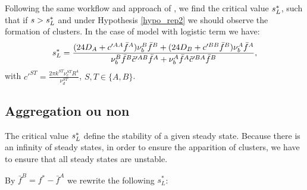 Following the same workflow  and approach of \cite{twoparticule}, we find the critical value ${s^{*}_{L}}$, such that if $s> {s^{*}_{L}}$ and under Hypothesis \ref{hypo_rep2} we should observe the formation of clusters. In the case of model with logistic term we have:
\begin{equation}
{s^{*}_{L}}=\frac{(24 D_A+c'^{AA}{\bar{f}^A})\nu_{b}^{B}\bar{f}^{B}+(24 D_B+c'^{BB}{\bar{f}^B})\nu_{b}^{A}\bar{f}^A}{\nu_{b}^{B}\bar{f}^B\tilde{c}'^{AB}{\bar{f}^A}+\nu_{b}^{A}\bar{f}^A\tilde{c}'^{BA}{\bar{f}^B}},
\end{equation}
with $c'^{ST}=\frac{2\pi k^{ST} \nu_c^{ST} R^{4}}{\nu_d^{ST}}$, $S,T \in \{ A,B \}$.


\subsection{Aggregation ou non}

The critical value ${s^{*}_{L}}$ define the stability of a given steady state. Because there is an infinity of steady states, in order to ensure the apparition of clusters, we have to ensure that all steady states are unstable.

By $\bar{f}^B=f^*-\bar{f}^A$ we rewrite the following $s^*_{L}$:


